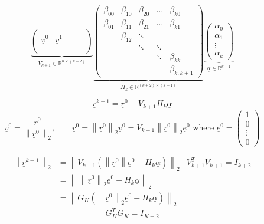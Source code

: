\documentclass{article}
\newcommand{\norm}[1]{\left\|#1\right\|}
\begin{document}
\[
  \underbrace{\begin{pmatrix}
    & & & & \\
    \underline v^0 & \underline v^1 & & & \\
    & & & & \\
  \end{pmatrix}}_{V_{k+1} \in \mathbb R^{n\times (k+2)}}
  \underbrace{\begin{pmatrix}
    \beta_{00} & \beta_{10} & \beta_{20} & \ldots & \beta_{k0} \\
    \beta_{01} & \beta_{11} & \beta_{21} & \ldots & \beta_{k1} \\
               & \beta_{12} & \ddots & & \\
               &            & \ddots & \ddots & \\
               &            &        & \ddots & \beta_{kk} \\
               &            &        &        & \beta_{k,k+1}
  \end{pmatrix}}_{H_k \in \mathbb R^{(k+2)\times(k+1)}}
  \underbrace{\begin{pmatrix} \alpha_0 \\ \alpha_1 \\ \vdots \\ \alpha_k \end{pmatrix}}_{\underline\alpha \in \mathbb R^{k+1}}
\]

\[ \underline r^{k+1} = \underline r^0 - V_{k+1} H_k \underline{\alpha} \]
\[ \underline v^0 = \frac{\underline r^0}{\norm{\underline r^0}_2}, \qquad \underline r^0 = \norm{\underline r^0}_2 \underline v^0 = V_{k+1} \norm{\underline r^0}_2 \underline e^0 \text{ where } \underline e^0 = \begin{pmatrix} 1 \\ 0 \\ \vdots \\ 0 \end{pmatrix} \]

\begin{align*}
  \norm{\underline r^{k+1}}_2
    &= \norm{V_{k+1} \left(\norm{\underline r^0} \underline e^0 - H_k \underline \alpha\right)}_2 & V_{k+1}^T V_{k+1} = I_{k+2} \\
    &= \norm{\,\norm{\underline r^0}_2 \underline e^0 - H_k \underline \alpha}_2 \\
    &= \norm{G_K\left(\norm{\underline r^0}_2 \underline e^0 - H_k \underline \alpha\right)}_2
\end{align*}
\[ G_K^T G_K = I_{K+2} \]
\end{document}
